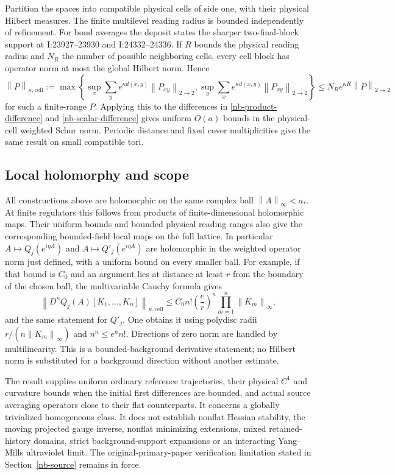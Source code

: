 \documentclass[11pt]{article}
\theoremstyle{remark}
\newcommand{\norm}[1]{\left\|#1\right\|}
\begin{document}
Partition the spaces into compatible physical cells of side
one, with their physical Hilbert measures. The finite
multilevel reading radius is bounded independently of
refinement. For bond averages the deposit states the sharper
two-final-block support at I:23927--23930 and I:24332--24336.
If $R$ bounds the physical reading radius and $N_R$ the
number of possible neighboring cells, every cell block has
operator norm at most the global Hilbert norm. Hence
\begin{equation}\label{nb-cell-Schur}
 \norm{P}_{\kappa,\mathrm{cell}}
 :=\max\left\{
 \sup_x\sum_y e^{\kappa d(x,y)}\norm{P_{xy}}_{2\to2},
 \sup_y\sum_x e^{\kappa d(x,y)}\norm{P_{xy}}_{2\to2}\right\}
 \le N_Re^{\kappa R}\norm{P}_{2\to2}
\end{equation}
for such a finite-range $P$. Applying this to the differences
in \eqref{nb-product-difference} and
\eqref{nb-scalar-difference} gives uniform $O(a)$ bounds in
the physical-cell weighted Schur norm. Periodic distance and
fixed cover multiplicities give the same result on small
compatible tori.

\subsection{Local holomorphy and scope}

All constructions above are holomorphic on the same complex
ball $\norm{A}_\infty<a_*$. At finite regulators this follows
from products of finite-dimensional holomorphic maps. Their
uniform bounds and bounded physical reading ranges also give
the corresponding bounded-field local maps on the full
lattice. In particular $A\mapsto Q_j(e^{i\eta A})$ and
$A\mapsto Q'_j(e^{i\eta A})$ are holomorphic in the weighted
operator norm just defined, with a uniform bound on every
smaller ball. For example, if that bound is $C_0$ and an
argument lies at distance at least $r$ from the boundary of
the chosen ball, the multivariable Cauchy formula gives
\begin{equation}\label{nb-Cauchy}
 \norm{D^nQ_j(A)[K_1,\ldots,K_n]}_{\kappa,\mathrm{cell}}
 \le C_0 n!\left(\frac er\right)^n
                         \prod_{m=1}^n\norm{K_m}_\infty,
\end{equation}
and the same statement for $Q'_j$. One obtains it using
polydisc radii $r/(n\norm{K_m}_\infty)$ and
$n^n\le e^n n!$. Directions of zero norm are handled by
multilinearity. This is a bounded-background derivative
statement; no Hilbert norm is substituted for a background
direction without another estimate.

The result supplies uniform ordinary reference trajectories,
their physical $C^1$ and curvature bounds when the initial
first differences are bounded, and actual source averaging
operators close to their flat counterparts. It concerns a
globally trivialized homogeneous class. It does not establish
nonflat Hessian stability, the moving projected gauge inverse,
nonflat minimizing extensions, mixed retained-history domains,
strict background-support expansions or an interacting
Yang--Mills ultraviolet limit. The original-primary-paper
verification limitation stated in Section~\ref{nb-source}
remains in force.
\end{document}
